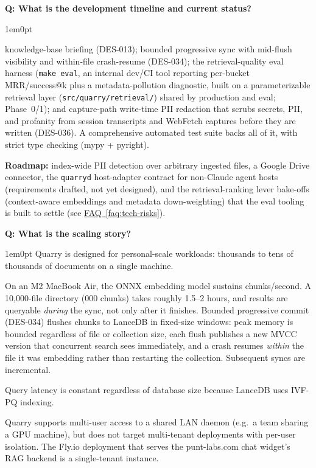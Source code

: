 \documentclass[11pt,letterpaper]{article}
\newcounter{faqnum}
\newenvironment{faqpair}[1]{%
  \needspace{4\baselineskip}%
  \vspace{0.5em}%
  \refstepcounter{faqnum}%
  \noindent\textbf{\color{SectionBlue}Q\thefaqnum: #1}\par\nopagebreak[4]%
  \vspace{0.2em}%
  \begin{adjustwidth}{1em}{0pt}%
  \setlength{\parindent}{0pt}%
}{%
  \end{adjustwidth}%
  \vspace{0.5em}%
}
\newcommand{\faqref}[1]{\hyperref[#1]{FAQ~\ref*{#1}}}
\begin{document}
\begin{faqpair}{What is the development timeline and current status?}
  knowledge-base briefing (DES-013); bounded progressive sync with mid-flush
  visibility and within-file crash-resume (DES-034); the retrieval-quality eval
  harness (\texttt{make eval}, an internal dev/CI tool reporting per-bucket
  MRR/success@k plus a metadata-pollution diagnostic, built on a
  parameterizable retrieval layer (\texttt{src/quarry/retrieval/}) shared by
  production and eval; Phase~0/1); and capture-path write-time PII redaction
  that scrubs secrets, PII, and profanity from session transcripts and
  WebFetch captures before they are written (DES-036). A comprehensive
  automated test suite backs all of it, with strict type checking
  (mypy + pyright).

  \textbf{Roadmap:} index-wide PII detection over arbitrary ingested files, a
  Google Drive connector, the \texttt{quarryd} host-adapter contract for
  non-Claude agent hosts (requirements drafted, not yet designed), and the
  retrieval-ranking lever bake-offs (context-aware embeddings and metadata
  down-weighting) that the eval tooling is built to settle (see
  \faqref{faq:tech-risks}).
\end{faqpair}

\begin{faqpair}{What is the scaling story?}\label{faq:scaling}
  Quarry is designed for personal-scale workloads: thousands to tens of
  thousands of documents on a single machine.

  On an M2 MacBook Air, the ONNX embedding model sustains 
  chunks/second. A 10{,}000-file directory (000 chunks)
  takes roughly 1.5--2 hours, and results are queryable \emph{during} the sync,
  not only after it finishes. Bounded progressive commit (DES-034) flushes
  chunks to LanceDB in fixed-size windows: peak memory is bounded regardless of
  file or collection size, each flush publishes a new MVCC version that
  concurrent search sees immediately, and a crash resumes \emph{within} the file
  it was embedding rather than restarting the collection. Subsequent syncs are
  incremental.

  Query latency is constant regardless of database size because LanceDB uses
  IVF-PQ indexing.

  Quarry supports multi-user access to a shared LAN daemon (e.g.\ a team
  sharing a GPU machine), but does not target multi-tenant deployments with
  per-user isolation. The Fly.io deployment that serves the punt-labs.com chat
  widget's RAG backend is a single-tenant instance.
\end{faqpair}
\end{document}
